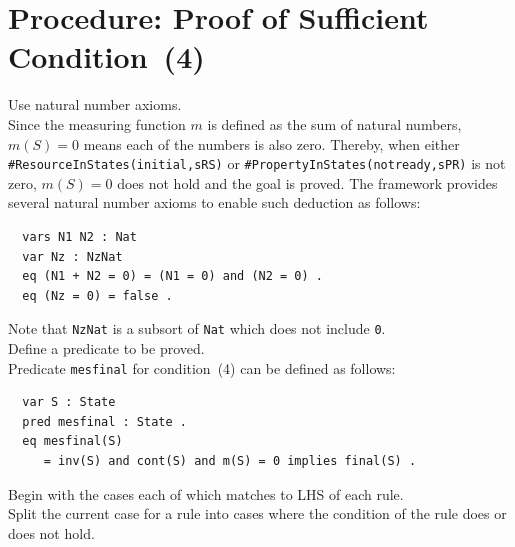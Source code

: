 \documentclass[12pt]{report}
\newcommand{\stt}[1]{{\small{\tt {#1}}}}
\begin{document}
\section{Procedure: Proof of Sufficient Condition~(4)}
\label{sec:mesfinal}
 Use natural number axioms. \\
Since the measuring function $m$ is defined as the sum of natural
numbers, $m(S) = 0$ means each of the numbers is also zero. Thereby,
when either \stt{\#ResourceInStates(initial,sRS)} or
\stt{\#PropertyInStates(notready,sPR)} is not zero, $m(S) = 0$ does
not hold and the goal is proved. The framework provides
several natural number axioms to enable such deduction as follows:
\small
\begin{verbatim}
  vars N1 N2 : Nat
  var Nz : NzNat
  eq (N1 + N2 = 0) = (N1 = 0) and (N2 = 0) .
  eq (Nz = 0) = false .
\end{verbatim}
\normalsize
Note that {\tt NzNat} is a subsort of {\tt Nat} which does not
include {\tt 0}.\\

 Define a predicate to be proved. \\ Predicate
         {\tt mesfinal} for condition~(4) can be defined as follows:
\small
\begin{verbatim}
  var S : State
  pred mesfinal : State .
  eq mesfinal(S)
     = inv(S) and cont(S) and m(S) = 0 implies final(S) .
\end{verbatim}
\normalsize

 Begin with the cases each of which matches to
LHS of each rule. \\ 
 Split the current case for a rule into
cases where the condition of the rule does or does not hold. 
\end{document}
